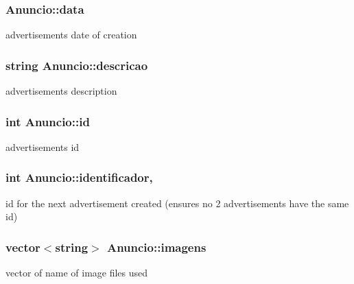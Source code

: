 \subsubsection[{data}]{ Anuncio\+::data\hspace{0.3cm}{\ttfamily [protected]}}\label{class_anuncio_a2c35b71b56332894a705eb2770d5102b}
advertisement\textquotesingle{}s date of creation \hypertarget{class_anuncio_aa6a9eb8d08cb06d16061b006eb2c8b97}{}
\subsubsection[{descricao}]{\setlength{\rightskip}{0pt plus 5cm}string Anuncio\+::descricao\hspace{0.3cm}{\ttfamily [protected]}}\label{class_anuncio_aa6a9eb8d08cb06d16061b006eb2c8b97}
advertisement\textquotesingle{}s description \hypertarget{class_anuncio_a42900203e39da639a1128277dbd96baf}{}
\subsubsection[{id}]{\setlength{\rightskip}{0pt plus 5cm}int Anuncio\+::id\hspace{0.3cm}{\ttfamily [protected]}}\label{class_anuncio_a42900203e39da639a1128277dbd96baf}
advertisement\textquotesingle{}s id \hypertarget{class_anuncio_a8ba7422723f267f5233584122e74919b}{}
\subsubsection[{identificador}]{\setlength{\rightskip}{0pt plus 5cm}int Anuncio\+::identificador\hspace{0.3cm}{\ttfamily [static]}, {\ttfamily [private]}}\label{class_anuncio_a8ba7422723f267f5233584122e74919b}
id for the next advertisement created (ensures no 2 advertisements have the same id) \hypertarget{class_anuncio_a9ff3646a44a2e285d082682e37631ac7}{}
\subsubsection[{imagens}]{\setlength{\rightskip}{0pt plus 5cm}vector$<$string$>$ Anuncio\+::imagens\hspace{0.3cm}{\ttfamily [protected]}}\label{class_anuncio_a9ff3646a44a2e285d082682e37631ac7}
vector of name of image files used \hypertarget{class_anuncio_a6a41218c0a11ba393522d3a9a80ded95}{}
